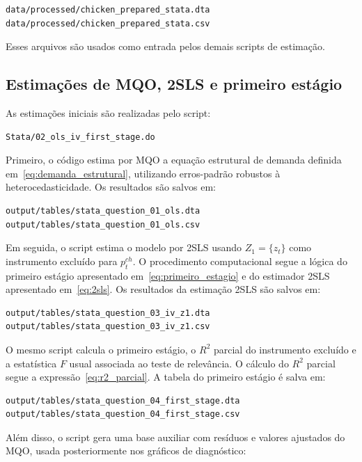 \documentclass[12pt,a4paper]{article}
\begin{document}
\begin{verbatim}
data/processed/chicken_prepared_stata.dta
data/processed/chicken_prepared_stata.csv
\end{verbatim}

Esses arquivos são usados como entrada pelos demais scripts de estimação.

\subsection*{Estimações de MQO, 2SLS e primeiro estágio}

As estimações iniciais são realizadas pelo script:

\begin{verbatim}
Stata/02_ols_iv_first_stage.do
\end{verbatim}

Primeiro, o código estima por MQO a equação estrutural de demanda definida em~\eqref{eq:demanda_estrutural}, utilizando erros-padrão robustos à heterocedasticidade. Os resultados são salvos em:

\begin{verbatim}
output/tables/stata_question_01_ols.dta
output/tables/stata_question_01_ols.csv
\end{verbatim}

Em seguida, o script estima o modelo por 2SLS usando \(Z_1=\{z_t\}\) como instrumento excluído para \(p_t^{ch}\). O procedimento computacional segue a lógica do primeiro estágio apresentado em~\eqref{eq:primeiro_estagio} e do estimador 2SLS apresentado em~\eqref{eq:2sls}. Os resultados da estimação 2SLS são salvos em:

\begin{verbatim}
output/tables/stata_question_03_iv_z1.dta
output/tables/stata_question_03_iv_z1.csv
\end{verbatim}

O mesmo script calcula o primeiro estágio, o \(R^2\) parcial do instrumento excluído e a estatística \(F\) usual associada ao teste de relevância. O cálculo do \(R^2\) parcial segue a expressão~\eqref{eq:r2_parcial}. A tabela do primeiro estágio é salva em:

\begin{verbatim}
output/tables/stata_question_04_first_stage.dta
output/tables/stata_question_04_first_stage.csv
\end{verbatim}

Além disso, o script gera uma base auxiliar com resíduos e valores ajustados do MQO, usada posteriormente nos gráficos de diagnóstico:
\end{document}
